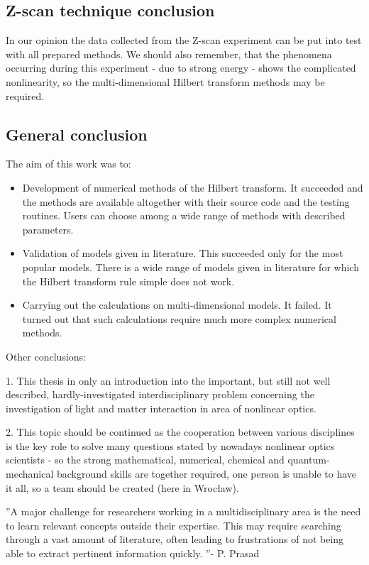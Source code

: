 \documentclass[12pt,twoside,a4paper]{article}
\numberwithin{equation}{subsection}
\numberwithin{figure}{subsection}
\begin{document}
\subsection{Z-scan technique conclusion} \label{chap:conclusion_zscan}

In our opinion the data collected from the Z-scan experiment can be put into test with all prepared methods. We should also
remember, that the phenomena occurring during this experiment - due to strong energy - shows the complicated nonlinearity, so the
multi-dimensional Hilbert transform methods may be required. 

\subsection{General conclusion} \label{chap:conclusion_general}

The aim of this work was to:

\begin{itemize} 
	\item Development of numerical methods of the Hilbert transform. It succeeded and the methods are available altogether with
	their source code and the testing routines. Users can choose among a wide range of methods with described parameters.
	\item Validation of models given in literature. This succeeded only for the most popular models. There is a wide range of models
	given in literature for which the Hilbert transform rule simple does not work.
	\item Carrying out the calculations on multi-dimensional models. It failed. It turned out that such calculations require much more
	complex numerical methods.
\end{itemize}

Other conclusions:

1. This thesis in only an introduction into the important, but still not well described, hardly-investigated interdisciplinary
problem concerning the investigation of light and matter interaction in area of nonlinear optics. 

2. This topic should be continued as the cooperation between various disciplines is the key role to solve many questions stated
by nowadays nonlinear optics scientists - so the strong mathematical, numerical, chemical and quantum-mechanical background skills
are together required, one person is unable to have it all, so a team should be created (here in Wrocław).

''A major challenge for researchers working in a multidisciplinary area is the need to learn relevant concepts outside their
expertise. This may require searching through a vast amount of literature, often leading to frustrations of not being able to
extract pertinent information quickly. ''- P. Prasad \cite{prasad_nanophotonics}
\end{document}
